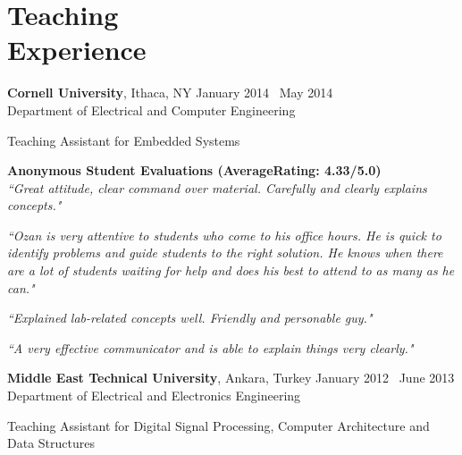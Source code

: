 \section{\mysidestyle \textcolor{olgray}{Teaching\\Experience}}
\textbf{Cornell University}, Ithaca, NY \hfill January 2014 \textendash ~May 2014 \vspace{0mm}\\\vspace{0mm}%
Department of Electrical and Computer Engineering \hfill \vspace{-7mm}\\\vspace{0mm}

Teaching Assistant for Embedded Systems  \hfill \vspace{0mm}\\\vspace{0mm}
\vspace{-4mm}

\textbf{Anonymous Student Evaluations (AverageRating: 4.33/5.0)} \\
\emph{``Great attitude, clear command over material. Carefully and clearly explains concepts."}

\emph{``Ozan is very attentive to students who come to his office hours. He is quick to identify problems and guide students to the right solution. He knows when there are a lot of students waiting for help and does his best to attend to as many as he can."}

\emph{``Explained lab-related concepts well. Friendly and personable guy."}

\emph{``A very effective
communicator and is able to explain things very clearly."}

\textbf{Middle East Technical University}, Ankara, Turkey \hfill January 2012 \textendash ~June 2013 \vspace{0mm}\\\vspace{0mm}%
Department of Electrical and Electronics Engineering \hfill \vspace{-7mm}\\\vspace{0mm}

Teaching Assistant for Digital Signal Processing, Computer Architecture and Data Structures \hfill \vspace{0mm}\\\vspace{0mm}
\vspace{-4mm}
